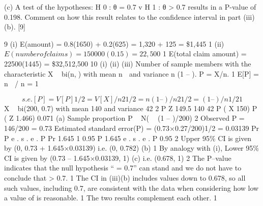\documentclass[a4paper,12pt]{article}
\begin{document}
(c) A test of the hypotheses:
H 0 : θ = 0.7 v H 1 : θ > 0.7
results in a P-value of 0.198.
Comment on how this result relates to the confidence interval in part
(iii)(b).
[9]

9
(i) E(amount) = 0.8(1650) + 0.2(625) = 1,320 + 125 = \$1,445 1
(ii) $E(number of claims) = 150000(0.15) = 22,500$ 1
E(total claim amount) = 22500(1445) = \$32,512,500
10
(i)
(ii)
(iii)
Number of sample members with the characteristic X ~ bi(n,) with mean
n  and variance n (1 – ). P = X/n. 1
E[P] = n  / n = 1

\[s.e.[P] = {V[P]}1/2 = {V[X]/n 2}1/2 = {n (1 – )/n 2 }1/2 = { (1 – )/n}1/2 1\]
X ~ bi(200, 0.7) with mean 140 and variance 42 2
P Z
149.5 140
42
P ( X 150)
P ( Z
1.466) 0.071
(a) Sample proportion P ~ N(  (1 – )/200)
2
Observed P = 146/200 = 0.73
Estimated standard error(P) = (0.73×0.27/200)1/2 = 0.03139
Pr
P
e . s . e . P
Pr
1.645
1
0.95
P 1.645 e . s . e . P
0.95
2
Upper 95\% CI is given by (0, 0.73 + 1.645×0.03139)
i.e. (0, 0.782)
(b)
1
By analogy with (i),
Lower 95\% CI is given by (0.73 – 1.645×0.03139, 1)
(c)
i.e. (0.678, 1) 2
The P–value indicates that the null hypothesis “ = 0.7” can stand and we do not have to conclude that > 0.7. 1
The CI in (iii)(b) includes values down to 0.678, so all such values, including 0.7, are consistent with the data when considering how low a value of is reasonable. 1
The two results complement each other. 1
\end{document}
